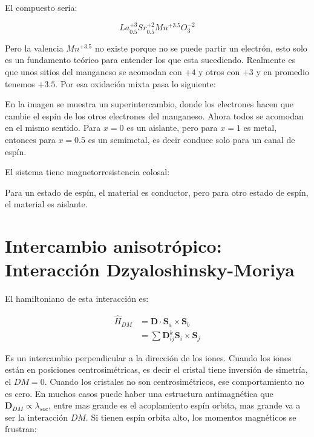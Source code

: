 \documentclass[11pt,fleqn]{book}
\renewcommand{\vec}[1]{\mathbf{#1}}
\begin{document}
\begin{example}[$x=0.5$]

El compuesto seria:

\begin{equation*}
La_{0.5}^{+3}Sr_{0.5}^{+2}Mn^{+3.5}O_{3}^{-2}    
\end{equation*}

Pero la valencia $Mn^{+3.5}$ no existe porque no se puede partir un electrón, esto solo es un fundamento teórico para entender los que esta sucediendo. Realmente es que unos sitios del manganeso se acomodan con $+4$ y otros con $+3$ y en promedio tenemos $+3.5$. Por esa oxidación mixta pasa lo siguiente:


En la imagen se muestra un superintercambio, donde los electrones hacen que cambie el espín de los otros electrones del manganeso. Ahora todos se acomodan en el mismo sentido. Para $x=0$ es un aislante, pero para $x=1$ es metal, entonces para $x=0.5$ es un semimetal, es decir conduce solo para un canal de espín.

\end{example}

El sistema tiene magnetorresistencia colosal:


Para un estado de espín, el material es conductor, pero para otro estado de espín, el material es aislante.

\section{Intercambio anisotrópico: Interacción Dzyaloshinsky-Moriya}

El hamiltoniano de esta interacción es:

\begin{equation}
\begin{split}
        \hat{H}_{DM}&=\vec{D}\cdot\vec{S}_{a}\times\vec{S}_{b}\\
        &=\sum \vec{D}_{ij}^{k}\vec{S}_{i}\times\vec{S}_{j}
\end{split}
    \label{Eq. 5.13}
\end{equation}

Es un intercambio perpendicular a la dirección de los iones. Cuando los iones están en posiciones centrosimétricas, es decir el cristal tiene inversión de simetría, el $DM=0$. Cuando los cristales no son centrosimétricos, ese comportamiento no es cero. En muchos casos puede haber una estructura antimagnética que $\vec{D}_{DM}\propto\lambda_{soc}$, entre mas grande es el acoplamiento espín orbita, mas grande va a ser la interacción $DM$. Si tienen espín orbita alto, los momentos magnéticos se frustran:
\end{document}
